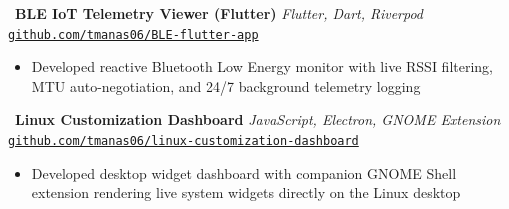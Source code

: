 \documentclass[11pt,a4paper]{article}
\newcommand{\projectentry}[4]{%
  \noindent
  \faGithub\ \textbf{#1} \hfill \textit{#2} \\
  {\small\texttt{#3}}
  \begin{itemize}[leftmargin=1.5em, itemsep=0.5pt, parsep=0pt, topsep=1pt]
    #4
  \end{itemize}
  \vspace{1.5pt}
}
\begin{document}
\projectentry{BLE IoT Telemetry Viewer (Flutter)}%
  {Flutter, Dart, Riverpod}%
  {\href{https://github.com/tmanas06/BLE-flutter-app}{github.com/tmanas06/BLE-flutter-app}}%
  {\item Developed reactive Bluetooth Low Energy monitor with live RSSI filtering, MTU auto-negotiation, and 24/7 background telemetry logging}

\projectentry{Linux Customization Dashboard}%
  {JavaScript, Electron, GNOME Extension}%
  {\href{https://github.com/tmanas06/linux-customization-dashboard}{github.com/tmanas06/linux-customization-dashboard}}%
  {\item Developed desktop widget dashboard with companion GNOME Shell extension rendering live system widgets directly on the Linux desktop}
\end{document}
